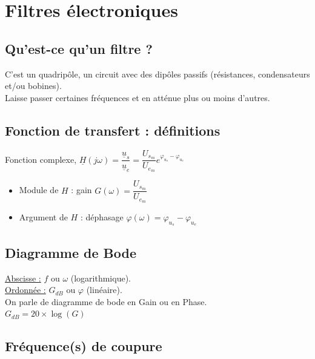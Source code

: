 \documentclass[13pt, twoside, a4paper, french]{report}
\begin{document}
    \chapter{Filtres électroniques}\label{ch:filtres-electroniques}

    \section{Qu'est-ce qu'un filtre ?}\label{sec:quest-ce-qu-un-filtre}

    C'est un quadripôle, un circuit avec des dipôles passifs (résistances, condensateurs et/ou bobines).\\
    Laisse passer certaines fréquences et en atténue plus ou moins d'autres.

    \section{Fonction de transfert : définitions}\label{sec:fonction-de-trandfert-definitions}

    Fonction complexe, $\underline{H}(j\omega) = \dfrac{\underline{u}_s}{\underline{u}_e} = \dfrac{U_s_m}{U_e_m} e^{\varphi_{u_s} - \varphi_{u_e}}$\\

    \begin{itemize}
        \item Module de $H$ : gain $G(\omega) = \dfrac{U_s_m}{U_e_m}$
        \item Argument de $H$ : déphasage $\varphi(\omega) = \varphi_{u_s} - \varphi_{u_e}$
    \end{itemize}

    \section{Diagramme de Bode}\label{sec:diagramme-de-bode}

    \underline{Abscisse :} $f$ ou $\omega$ (logarithmique).\\
    \underline{Ordonnée :} $G_{dB}$ ou $\varphi$ (linéaire).\\
    On parle de diagramme de bode en Gain ou en Phase.\\

    $G_{dB} = 20 \times \log(G)$

    \section{Fréquence(s) de coupure}\label{sec:frequence-s-de-coupure}
\end{document}
